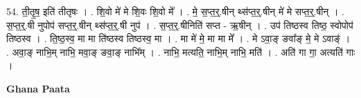 \documentclass[17pt]{extarticle}
\begin{document}
54. ती॒तृ॒ष॒ इति॑ तीतृषः । . शि॒वो मे॑ मे शि॒वः शि॒वो मे᳚ । . मे॒ स॒प्त॒र्॒.षीन् थ्स॑प्त॒र्॒.षीन् मे॑ मे सप्त॒र्॒.षीन् । . स॒प्त॒र्॒.षी नुपोप॑ सप्त॒र्॒.षीन् थ्स॑प्त॒र्॒.षी नुप॑ । . स॒प्त॒र्॒.षीनिति॑ सप्त - ऋ॒षीन् । . उप॑ तिष्ठस्व तिष्ठ॒ स्वोपोप॑ तिष्ठस्व । . ति॒ष्ठ॒स्व॒ मा मा ति॑ष्ठस्व तिष्ठस्व॒ मा । . मा मे॑ मे॒ मा मा मे᳚ । . मे ऽवा॒ङ् ङवा᳚ङ् मे॒ मे ऽवाङ्॑ । . अवा॒ङ् नाभि॒म् नाभि॒ मवा॒ङ् ङवा॒ङ् नाभि᳚म् । . नाभि॒ मत्यति॒ नाभि॒म् नाभि॒ मति॑ । . अति॑ गा गा॒ अत्यति॑ गाः । \newline

\textbf{Ghana Paata } \newline
\end{document}
